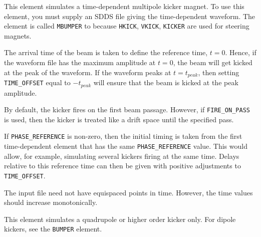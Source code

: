 This element simulates a time-dependent multipole kicker magnet.  To
use this element, you must supply an SDDS file giving the
time-dependent waveform.  The element is called {\tt MBUMPER} to
because {\tt HKICK}, {\tt VKICK}, {\tt KICKER} are used for steering
magnets.

The arrival time of the beam is taken to define the reference time,
$t=0$.  Hence, if the waveform file has the maximum amplitude at
$t=0$, the beam will get kicked at the peak of the waveform.  If the waveform
peaks at $t=t_{peak}$, then setting \verb|TIME_OFFSET| equal to $-t_{peak}$
will ensure that the beam is kicked at the peak amplitude.

By default, the kicker fires on the first beam passage.  However, if 
\verb|FIRE_ON_PASS| is used, then the kicker is treated like a drift space until
the specified pass.

If \verb|PHASE_REFERENCE| is non-zero, then the initial timing is
taken from the first time-dependent element that has the same
\verb|PHASE_REFERENCE| value.  This would allow, for example,
simulating several kickers firing at the same time.  Delays relative
to this reference time can then be given with positive adjustments to
\verb|TIME_OFFSET|.

The input file need not have equispaced points in time.  However, the
time values should increase monotonically.

This element simulates a quadrupole or higher order kicker
only.  For dipole kickers, see the {\tt BUMPER} element.

